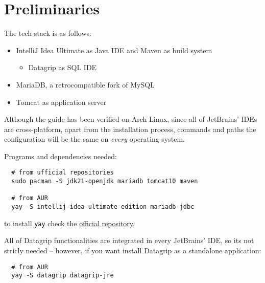 \section{Preliminaries}

The tech stack is as follows:
\begin{itemize}
  \item IntelliJ Idea Ultimate as Java IDE and Maven as build system
    \begin{itemize}
      \item Datagrip as SQL IDE
    \end{itemize}
  \item MariaDB, a retrocompatible fork of MySQL
  \item Tomcat as application server
\end{itemize}

\begin{hint}[OS compatibility]{}
  Although the guide has been verified on Arch Linux, since all of JetBrains' IDEs are cross-platform, apart from the installation process, commands and paths the configuration will be the same on \textit{every} operating system.
\end{hint}

Programs and dependencies needed:
\begin{verbatim}
  # from ufficial repositories
  sudo pacman -S jdk21-openjdk mariadb tomcat10 maven

  # from AUR
  yay -S intellij-idea-ultimate-edition mariadb-jdbc
\end{verbatim}

to install \texttt{yay} check the \href{https://github.com/Jguer/yay?tab=readme-ov-file#installation}{official repository}.

All of Datagrip functionalities are integrated in every JetBrains' IDE, so its not stricly needed -- however, if you want install Datagrip as a standalone application:
\begin{verbatim}
  # from AUR
  yay -S datagrip datagrip-jre
\end{verbatim}
